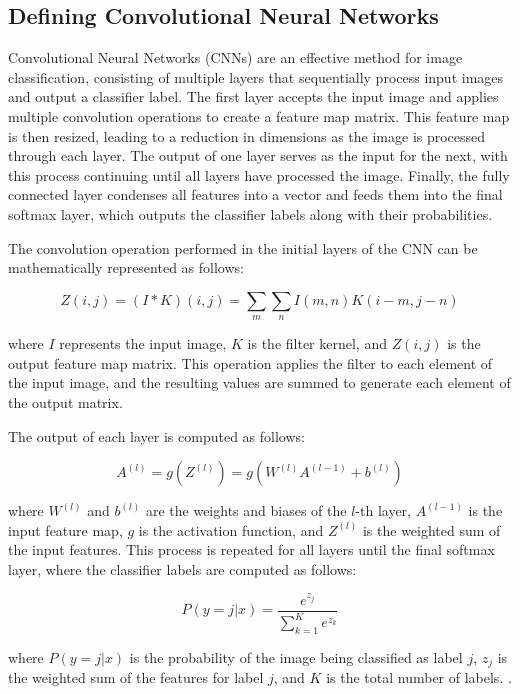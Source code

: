\documentclass[conference]{IEEEtran}
\begin{document}
\subsection{Defining Convolutional Neural Networks}

Convolutional Neural Networks (CNNs) are an effective method for image classification, consisting of multiple layers that sequentially process input images and output a classifier label. The first layer accepts the input image and applies multiple convolution operations to create a feature map matrix. This feature map is then resized, leading to a reduction in dimensions as the image is processed through each layer. The output of one layer serves as the input for the next, with this process continuing until all layers have processed the image. Finally, the fully connected layer condenses all features into a vector and feeds them into the final softmax layer, which outputs the classifier labels along with their probabilities.

The convolution operation performed in the initial layers of the CNN can be mathematically represented as follows:

\begin{equation}
Z(i,j) = (I * K)(i,j) = \sum_m \sum_n I(m,n) K(i-m,j-n)
\end{equation}

where $I$ represents the input image, $K$ is the filter kernel, and $Z(i,j)$ is the output feature map matrix. This operation applies the filter to each element of the input image, and the resulting values are summed to generate each element of the output matrix.

The output of each layer is computed as follows:

\begin{equation}
A^{(l)} = g(Z^{(l)}) = g(W^{(l)}A^{(l-1)} + b^{(l)})
\end{equation}

where $W^{(l)}$ and $b^{(l)}$ are the weights and biases of the $l$-th layer, $A^{(l-1)}$ is the input feature map, $g$ is the activation function, and $Z^{(l)}$ is the weighted sum of the input features. This process is repeated for all layers until the final softmax layer, where the classifier labels are computed as follows:

\begin{equation}
P(y=j|x) = \frac{e^{z_j}}{\sum_{k=1}^K e^{z_k}}
\end{equation}

where $P(y=j|x)$ is the probability of the image being classified as label $j$, $z_j$ is the weighted sum of the features for label $j$, and $K$ is the total number of labels.  \cite{Smeda}. 
\end{document}
